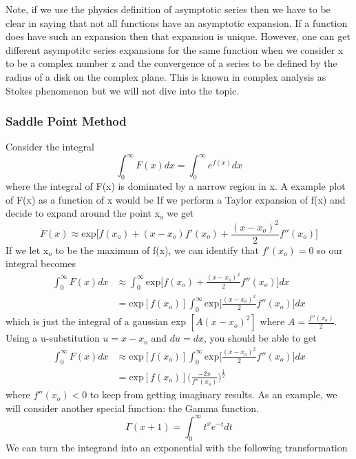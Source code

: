 \documentclass{article}
\newcommand{\be}{\begin{equation}}
\newcommand{\ee}{\end{equation}}
\begin{document}
Note, if we use the physics definition of asymptotic series then we have to be clear in saying that not all functions have an asymptotic expansion.
If a function does have such an expansion then that expansion is unique.
However, one can get different asympotitc series expansions for the same function when we consider x to be a complex number z and the convergence of a series to be defined by the radius of a disk on the complex plane.
This is known in complex analysis as Stokes phenomenon but we will not dive into the topic.

\subsubsection*{Saddle Point Method}
Consider the integral
\be
  \int_0^{\infty} F(x) dx = \int_0^{\infty} e^{f(x)} dx
\ee
where the integral of F(x) is dominated by a narrow region in x.
A example plot of F(x) as a function of x would be
If we perform a Taylor expansion of f(x) and decide to expand around the point x$_o$ we get
\be
  F(x) \approx \text{exp} \Big[ f(x_o) + (x - x_o)f'(x_o) + \frac{(x - x_o)^2}{2}f''(x_o) \Big]
\ee
If we let x$_o$ to be the maximum of f(x), we can identify that $f'(x_o) = 0$ so our integral becomes
\be
  \begin{split}
    \int_0^{\infty} F(x) dx &\approx \int_0^{\infty} \text{exp} \big[ f(x_o) + \frac{(x - x_o)^2}{2}f''(x_o) \Big] dx \\
    &= \text{exp}[f(x_o)] \int_0^{\infty} \text{exp} \Big[ \frac{(x - x_o)^2}{2}f''(x_o) \Big] dx
  \end{split}
\ee
which is just the integral of a gaussian exp $[A(x-x_o)^2]$ where $A = \frac{f''(x_o)}{2}$.
Using a u-substitution $u = x - x_o$ and $du = dx$, you should be able to get
\be
  \begin{split}
      \int_0^{\infty} F(x) dx &\approx \text{exp}[f(x_o)] \int_0^{\infty} \text{exp} \Big[ \frac{(x - x_o)^2}{2}f''(x_o) \Big] dx \\
      &= \text{exp}[f(x_o)] \Big( \frac{-2 \pi}{f''(x_o)} \Big) ^{\frac{1}{2}}
  \end{split}
\ee
where $f''(x_o) < 0$ to keep from getting imaginary results.
As an example, we will consider another special function: the Gamma function.
\be
  \Gamma(x+1) = \int_0^{\infty} t^{x} e^{-t} dt
\ee
We can turn the integrand into an exponential with the following transformation
\end{document}
